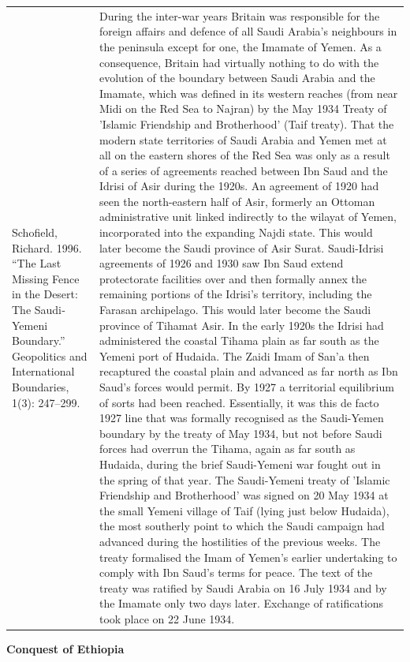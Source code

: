 {\begin{longtable}{p{}p{}}
Schofield, Richard. 1996. “The Last Missing Fence in the Desert: The Saudi‐Yemeni Boundary.” Geopolitics and International Boundaries, 1(3): 247–299. & During the inter-war years Britain was responsible for the foreign affairs and defence of all Saudi Arabia's neighbours in the peninsula except for one, the Imamate of Yemen. As a consequence, Britain had virtually nothing to do with the evolution of the boundary between Saudi Arabia and the Imamate, which was defined in its western reaches (from near Midi on the Red Sea to Najran) by the May 1934 Treaty of 'Islamic Friendship and Brotherhood' (Taif treaty). That the modern state territories of Saudi Arabia and Yemen met at all on the eastern shores of the Red Sea was only as a result of a series of agreements reached between Ibn Saud and the Idrisi of Asir during the 1920s. An agreement of 1920 had seen the north-eastern half of Asir, formerly an Ottoman administrative unit linked indirectly to the wilayat of Yemen, incorporated into the expanding Najdi state. This would later become the Saudi province of Asir Surat. Saudi-Idrisi agreements of 1926 and 1930 saw Ibn Saud extend protectorate facilities over and then formally annex the remaining portions of the Idrisi's territory, including the Farasan archipelago. This would later become the Saudi province of Tihamat Asir. In the early 1920s the Idrisi had administered the coastal Tihama plain as far south as the Yemeni port of Hudaida. The Zaidi Imam of San'a then recaptured the coastal plain and advanced as far north as Ibn Saud's forces would permit. By 1927 a territorial equilibrium of sorts had been reached. Essentially, it was this de facto 1927 line that was formally recognised as the Saudi-Yemen boundary by the treaty of May 1934, but not before Saudi forces had overrun the Tihama, again as far south as Hudaida, during the brief Saudi-Yemeni war fought out in the spring of that year. The Saudi-Yemeni treaty of 'Islamic Friendship and Brotherhood' was signed on 20 May 1934 at the small Yemeni village of Taif (lying just below Hudaida), the most southerly point to which the Saudi campaign had advanced during the hostilities of the previous weeks. The treaty formalised the Imam of Yemen's earlier undertaking to comply with Ibn Saud's terms for peace. The text of the treaty was ratified by Saudi Arabia on 16 July 1934 and by the Imamate only two days later. Exchange of ratifications took place on 22 June 1934.
\\
\end{longtable}}
\clearpage
         \textbf{Conquest of Ethiopia} 

